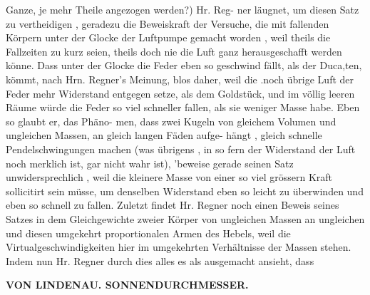 \documentclass[12pt,a4paper]{article}
\begin{document}
Ganze,  je  mehr  Theile  angezogen  werden?)  Hr.  Reg- ner läugnet,  um  diesen  Satz  zu  vertheidigen ,  geradezu  die  Beweiskraft  der  Versuche,  die  mit  fallenden Körpern  unter  der  Glocke  der  Luftpumpe  gemacht  worden ,  weil  theils  die  Fallzeiten  zu  kurz  seien, theils  doch  nie  die  Luft  ganz  herausgeschafft  werden  könne.  Dass  unter  der  Glocke  die  Feder  eben  so geschwind  fällt,  als  der  Duca,ten,  kömmt,  nach  Hrn.  Regner's  Meinung,  blos  daher,  weil  die  .noch übrige  Luft  der  Feder  mehr  Widerstand  entgegen  setze,  als  dem  Goldstück,  und  im  völlig  leeren  Räume würde  die  Feder  so  viel  schneller  fallen,  als  sie  weniger  Masse  habe.  Eben  so  glaubt  er,  das  Phäno- men, dass  zwei  Kugeln  von  gleichem  Volumen  und  ungleichen  Massen,  an  gleich  langen  Fäden  aufge- hängt ,  gleich  schnelle  Pendelschwingungen  machen  (was  übrigens ,  in  so  fern  der  Widerstand  der Luft  noch  merklich  ist,  gar  nicht  wahr  ist),  'beweise  gerade  seinen  Satz  unwidersprechlich ,  weil  die kleinere  Masse  von  einer  so  viel  grössern  Kraft  sollicitirt  sein  müsse,  um  denselben  Widerstand  eben so  leicht  zu  überwinden  und  eben  so  schnell  zu  fallen.  Zuletzt  findet  Hr.  Regner  noch  einen  Beweis seines  Satzes  in  dem  Gleichgewichte  zweier  Körper  von  ungleichen  Massen  an  ungleichen  und  diesen umgekehrt  proportionalen  Armen  des  Hebels,  weil  die  Virtualgeschwindigkeiten  hier  im  umgekehrten Verhältnisse  der  Massen  stehen.     Indem  nun  Hr.  Regner  durch  dies  alles  es  als  ausgemacht  ansieht,  dass

\vspace{0.5em}


\noindent\textbf{VON  LINDENAU.   SONNENDURCHMESSER.}
\end{document}
